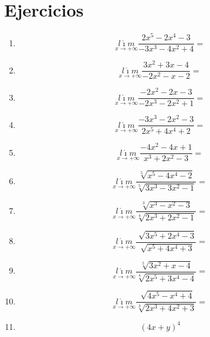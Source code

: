 \documentclass[oneside,spanish,letter]{article}
\begin{document}
\section{Ejercicios}
\begin{enumerate}
 \item $$\underset{x\rightarrow +\infty}{l\acute{\imath}m} \frac{2x^5-2x^4-3}{-3x^3-4x^2+4}=$$
 \item $$\underset{x\rightarrow +\infty}{l\acute{\imath}m} \frac{3x^2+3x-4}{-2x^2-x-2}=$$
 \item $$\underset{x\rightarrow +\infty}{l\acute{\imath}m} \frac{-2x^2-2x-3}{-2x^3-2x^2+1}=$$
 \item $$\underset{x\rightarrow +\infty}{l\acute{\imath}m} \frac{-3x^3-2x^2-3}{2x^5+4x^4+2}=$$
 \item $$\underset{x\rightarrow +\infty}{l\acute{\imath}m} \frac{-4x^2-4x+1}{x^3+2x^2-3}=$$
 \item $$\underset{x\rightarrow +\infty}{l\acute{\imath}m} \frac{\sqrt[5]{x^5-4x^4-2}}{\sqrt[5]{3x^3-3x^2-1}}=$$
 \item $$\underset{x\rightarrow +\infty}{l\acute{\imath}m} \frac{\sqrt[3]{x^3-x^2-3}}{\sqrt[4]{2x^3+2x^2-1}}=$$
 \item $$\underset{x\rightarrow +\infty}{l\acute{\imath}m} \frac{\sqrt[]{3x^5+2x^4-3}}{\sqrt[]{x^5+4x^4+3}}=$$
 \item $$\underset{x\rightarrow +\infty}{l\acute{\imath}m} \frac{\sqrt[5]{3x^2+x-4}}{\sqrt[4]{2x^5+3x^4-4}}=$$
 \item $$\underset{x\rightarrow +\infty}{l\acute{\imath}m} \frac{\sqrt[]{4x^5-x^4+4}}{\sqrt[3]{2x^3+4x^2+3}}=$$
\item $$(4x+y)^4$$
 \end{enumerate}
  \newpage
\end{document}
